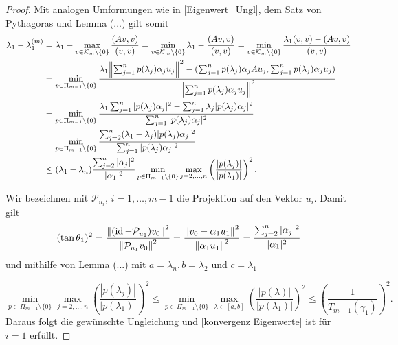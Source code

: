 \documentclass{article}
\begin{document}
\begin{theorem}
\begin{proof}
	Mit analogen Umformungen wie in \ref{Eigenwert_Ungl}, dem Satz von Pythagoras und Lemma (...) gilt somit
	\begin{equation}
		\label{Ungl i=1}
		\begin{aligned}
			\lambda_1 - \lambda_1^{(m)} &= \lambda_1 - \max_{v \in \mathcal{K}_m \setminus\{0\}} \frac{(Av,v)}{(v,v)} = \min_{v \in \mathcal{K}_m\setminus\{0\}} \lambda_1 - \frac{(Av,v)}{(v,v)} = \min_{v \in \mathcal{K}_m\setminus\{0\}} \frac{\lambda_1(v,v) - (Av,v)}{(v,v)} \\ &= \min_{p\in \Pi_{m-1}\setminus \{0\}} \frac{\lambda_1 {\left \| \sum_{j=1}^{n}p(\lambda_j)\alpha_j u_j \right \|}_{}^2 - (\sum_{j=1}^{n}p(\lambda_j)\alpha_j A u_j,\sum_{j=1}^{n}p(\lambda_j)\alpha_j u_j)}{{\left \| \sum_{j=1}^{n}p(\lambda_j)\alpha_j u_j \right \|}_{}^2} \\
			&= \min_{p\in \Pi_{m-1}\setminus \{0\}} \frac{\lambda_1 \sum_{j=1}^{n} |p(\lambda_j)\alpha_j|^2 - \sum_{j=1}^{n} \lambda_j |p(\lambda_j)\alpha_j|^2 }{\sum_{j=1}^{n} |p(\lambda_j)\alpha_j|^2} \\
			&=  \min_{p\in \Pi_{m-1}\setminus \{0\}} \frac{\sum_{j=2}^{n} (\lambda_1 - \lambda_j)|p(\lambda_j)\alpha_j|^2}{\sum_{j=1}^{n} |p(\lambda_j)\alpha_j|^2} \\
			&\le (\lambda_1 - \lambda_n) \frac{\sum_{j=2}^{n} |\alpha_j|^2}{|\alpha_1|^2} \min_{p\in \Pi_{m-1}\setminus \{0\}} \max_{j=2,\dots,n} \left(\frac{|p(\lambda_j)|}{|p(\lambda_1)|}\right)^2.
		\end{aligned}
	\end{equation}
		
	Wir bezeichnen mit $\mathcal{P}_{u_i}, \, i = 1,\dots, m-1$ die Projektion auf den Vektor $u_i$. Damit gilt
		\begin{equation*}
			(\tan\theta_1)^2 = \frac{{\left \| (\operatorname{id} - \mathcal{P}_{u_1})v_0 \right \|}_{}^2}{{\left \|  \mathcal{P}_{u_1}v_0 \right \|}_{}^2} = \frac{{\left \| v_0 - \alpha_1 u_1 \right \|}_{}^2}{{\left \| \alpha_1 u_1 \right \|}_{}^2} = \frac{\sum_{j=2}^{n} |\alpha_j|^2}{|\alpha_1|^2}
		\end{equation*}
	und mithilfe von Lemma (...) mit $a = \lambda_n, b= \lambda_2$ und $c= \lambda_1$
	
		\begin{equation*}
			\min_{p\in \Pi_{m-1}\setminus \{0\}} \max_{j=2,\dots,n} 		\left(\frac{|p(\lambda_j)|}{|p(\lambda_1)|}\right)^2 \le \min_{p\in \Pi_{m-1}\setminus \{0\}} \max_{\lambda \in [a,b]} \left(\frac{|p(\lambda)|}{|p(\lambda_1)|}\right)^2 \le \left(\frac{1}{T_{m-1}(\gamma_1)}\right)^2.
		\end{equation*}
	Daraus folgt die gewünschte Ungleichung und \ref{konvergenz Eigenwerte} ist für $i = 1$ erfüllt.
	

\end{proof}
\end{theorem}
\end{document}
